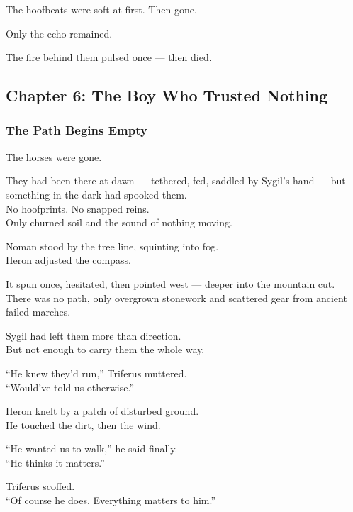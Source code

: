 \documentclass[12pt]{article}
\begin{document}
The hoofbeats were soft at first. Then gone.

Only the echo remained.

The fire behind them pulsed once — then died.

\newpage

\subsection*{Chapter 6: The Boy Who Trusted Nothing}

\vspace{.5in}

\subsubsection*{The Path Begins Empty}

The horses were gone.

They had been there at dawn — tethered, fed, saddled by Sygil’s hand — but something in the dark had spooked them.\\
No hoofprints. No snapped reins.\\
Only churned soil and the sound of nothing moving.

\vspace{1em}

Noman stood by the tree line, squinting into fog.\\
Heron adjusted the compass.

It spun once, hesitated, then pointed west — deeper into the mountain cut.\\
There was no path, only overgrown stonework and scattered gear from ancient failed marches.

Sygil had left them more than direction.\\
But not enough to carry them the whole way.

\vspace{1em}

“He knew they’d run,” Triferus muttered.\\
“Would’ve told us otherwise.”

Heron knelt by a patch of disturbed ground.\\
He touched the dirt, then the wind.

“He wanted us to walk,” he said finally.\\
“He thinks it matters.”

\vspace{1em}

Triferus scoffed.\\
“Of course he does. Everything matters to him.”
\end{document}
